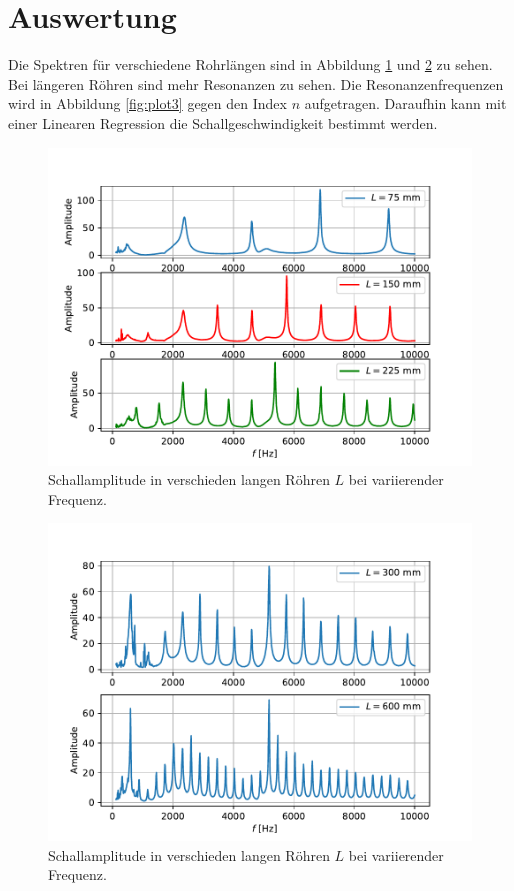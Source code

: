 \section{Auswertung}
Die Spektren für verschiedene Rohrlängen sind in Abbildung \ref{fig:plot1} und \ref{fig:plot2} zu sehen. Bei längeren
Röhren sind mehr Resonanzen zu sehen. Die Resonanzenfrequenzen wird in Abbildung \ref{fig:plot3} gegen den Index $n$ aufgetragen.
Daraufhin kann mit einer Linearen Regression die Schallgeschwindigkeit bestimmt werden.
\begin{figure}
  \centering
  \includegraphics[scale=0.45]{Messwerte/plot1.pdf}
  \caption{Schallamplitude in verschieden langen Röhren $L$ bei variierender Frequenz.}
  \label{fig:plot1}
\end{figure}
\begin{figure}
  \centering
  \includegraphics[scale=0.45]{Messwerte/plot2.pdf}
  \caption{Schallamplitude in verschieden langen Röhren $L$ bei variierender Frequenz.}
  \label{fig:plot2}
\end{figure}

